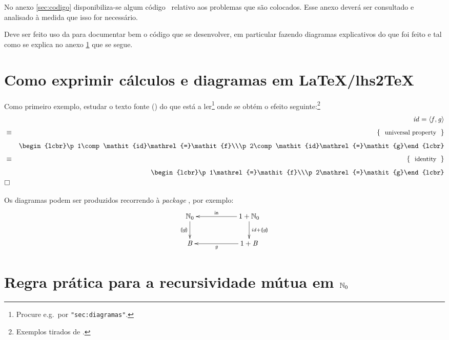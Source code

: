 \documentclass[11pt, a4paper, fleqn]{article}
\newcommand{\Conid}[1]{\mathit{#1}}
\newcommand{\Varid}[1]{\mathit{#1}}
\begin{document}
No anexo \ref{sec:codigo} disponibiliza-se algum código \Haskell\ relativo
aos problemas que são colocados. Esse anexo deverá ser consultado e analisado
à medida que isso for necessário.

Deve ser feito uso da  para documentar bem o código que se
desenvolver, em particular fazendo diagramas explicativos do que foi feito e
tal como se explica no anexo \ref{sec:diagramas} que se segue.

\section{Como exprimir cálculos e diagramas em LaTeX/lhs2TeX} \label{sec:diagramas}

Como primeiro exemplo, estudar o texto fonte () do que está a ler\footnote{
Procure e.g.\ por \texttt{"sec:diagramas"}.} onde se obtém o efeito seguinte:\footnote{Exemplos
tirados de \cite{Ol05}.}
\begin{eqnarray*}
\start
\ensuremath{\Varid{id}\mathrel{=}\conj{\Varid{f}}{\Varid{g}}}
\just\equiv{ universal property }
\ensuremath{\begin{lcbr}\p1\comp \Varid{id}\mathrel{=}\Varid{f}\\\p2\comp \Varid{id}\mathrel{=}\Varid{g}\end{lcbr}}
\just\equiv{ identity }
\ensuremath{\begin{lcbr}\p1\mathrel{=}\Varid{f}\\\p2\mathrel{=}\Varid{g}\end{lcbr}}
\qed
\end{eqnarray*}

Os diagramas podem ser produzidos recorrendo à \emph{package} \Xymatrix, por exemplo:
\begin{eqnarray*}
\xymatrix@C=2cm{
    \ensuremath{\N_0}
           \ar[d]_-{\ensuremath{\cataNat{\Varid{g}}}}
&
    \ensuremath{\mathrm{1}\mathbin{+}\N_0}
           \ar[d]^{\ensuremath{\Varid{id}\mathbin{+}\cataNat{\Varid{g}}}}
           \ar[l]_-{\ensuremath{\mathsf{in}}}
\\
     \ensuremath{\Conid{B}}
&
     \ensuremath{\mathrm{1}\mathbin{+}\Conid{B}}
           \ar[l]^-{\ensuremath{\Varid{g}}}
}
\end{eqnarray*}

\section{Regra prática para a recursividade mútua em \ensuremath{\N_0}}\label{sec:mr}
\end{document}
